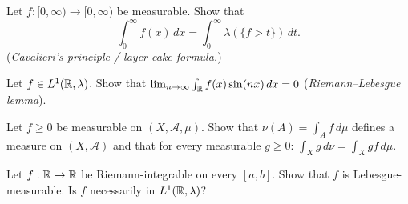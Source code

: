 \begin{exercise}
Let $f : [0, \infty) \to [0, \infty)$ be measurable. Show that
\[
\int_0^\infty f(x)\, dx = \int_0^\infty \lambda(\{f > t\})\, dt.
\]
(\emph{Cavalieri's principle / layer cake formula.})
\end{exercise}

\begin{exercise}
Let $f \in L^1(\mathbb{R}, \lambda)$. Show that
$\lim_{n \to \infty} \int_{\mathbb{R}} f(x) \sin(nx)\, dx = 0$
(\emph{Riemann--Lebesgue lemma}).
\end{exercise}

\begin{exercise}
Let $f \geq 0$ be measurable on $(X, \mathcal{A}, \mu)$. Show that
$\nu(A) = \int_A f\, d\mu$ defines a measure on $(X, \mathcal{A})$ and that
for every measurable $g \geq 0$:
$\int_X g\, d\nu = \int_X gf\, d\mu$.
\end{exercise}

\begin{exercise}
Let $f : \mathbb{R} \to \mathbb{R}$ be Riemann-integrable on every $[a, b]$. Show that $f$ is
Lebesgue-measurable. Is $f$ necessarily in $L^1(\mathbb{R}, \lambda)$?
\end{exercise}
